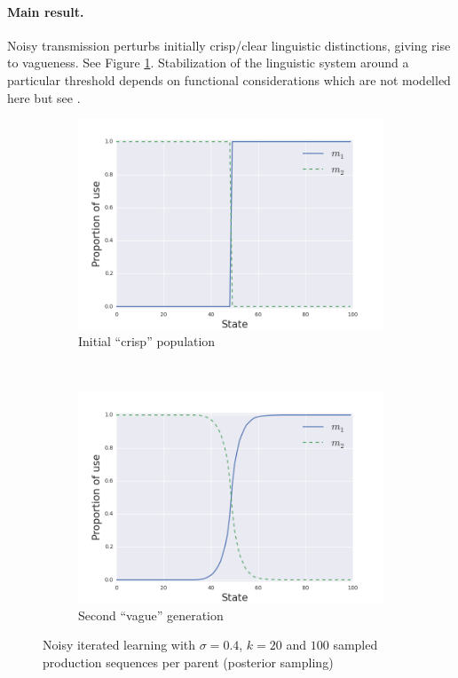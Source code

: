 \documentclass[11pt]{article}
\begin{document}
\paragraph{Main result.} Noisy transmission perturbs initially crisp/clear linguistic distinctions, giving rise to vagueness. See Figure \ref{fig:vag}. Stabilization of the linguistic system around a  particular threshold depends on functional considerations which are not modelled here but see \citealt{franke+correia:toappear}.

\begin{figure}[ht]
  \centering
  \begin{subfigure}[b]{0.45\textwidth}
    \includegraphics[scale=0.4]{../code/plots/vag-gen0.png}
    \caption{Initial ``crisp'' population}
  \end{subfigure}
  ~
   \begin{subfigure}[b]{0.45\textwidth}
    \includegraphics[scale=0.4]{../code/plots/vag-gen1.png}
    \caption{Second ``vague'' generation}
  \end{subfigure}
  \caption{Noisy iterated learning with $\sigma = 0.4$, $k = 20$ and $100$ sampled production sequences per parent (posterior sampling)}
  \label{fig:vag}
\end{figure}
 
\end{document}
